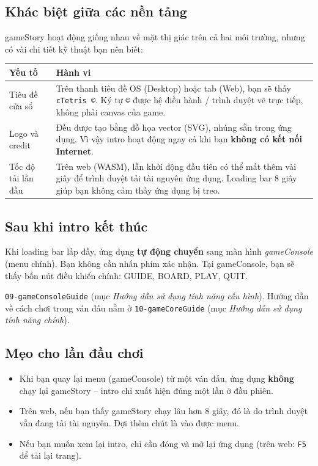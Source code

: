 \documentclass[12pt,a4paper]{article}
\begin{document}
\subsection{Khác biệt giữa các nền tảng}
gameStory hoạt động giống nhau về mặt thị giác trên cả hai môi trường, nhưng có vài chi tiết kỹ thuật bạn nên biết:

\vspace{4pt}
\begin{tabularx}{\linewidth}{|l|X|}
    \hline
    \textbf{Yếu tố} & \textbf{Hành vi} \\
    \hline
    Tiêu đề cửa sổ & Trên thanh tiêu đề OS (Desktop) hoặc tab (Web), bạn sẽ thấy \texttt{cTetris ©}. Ký tự \texttt{©} được hệ điều hành / trình duyệt vẽ trực tiếp, không phải canvas của game. \\
    \hline
    Logo và credit  & Đều được tạo bằng đồ họa vector (SVG), nhúng sẵn trong ứng dụng. Vì vậy intro hoạt động ngay cả khi bạn \textbf{không có kết nối Internet}. \\
    \hline
    Tốc độ tải lần đầu & Trên web (WASM), lần khởi động đầu tiên có thể mất thêm vài giây để trình duyệt tải tài nguyên ứng dụng. Loading bar 8 giây giúp bạn không cảm thấy ứng dụng bị treo. \\
    \hline
\end{tabularx}

\subsection{Sau khi intro kết thúc}
Khi loading bar lấp đầy, ứng dụng \textbf{tự động chuyển} sang màn hình \textit{gameConsole} (menu chính). Bạn không cần nhấn phím xác nhận. Tại gameConsole, bạn sẽ thấy bốn nút điều khiển chính: GUIDE, BOARD, PLAY, QUIT.
\begin{center}
\end{center}
\texttt{09-gameConsoleGuide} (mục \emph{Hướng dẫn sử dụng tính năng cấu hình}). Hướng dẫn về cách chơi trong ván đấu nằm ở \texttt{10-gameCoreGuide} (mục \emph{Hướng dẫn sử dụng tính năng chính}).

\subsection{Mẹo cho lần đầu chơi}
\begin{itemize}
    \item Khi bạn quay lại menu (gameConsole) từ một ván đấu, ứng dụng \textbf{không} chạy lại gameStory -- intro chỉ xuất hiện đúng một lần ở đầu phiên.
    \item Trên web, nếu bạn thấy gameStory chạy lâu hơn 8 giây, đó là do trình duyệt vẫn đang tải tài nguyên. Đợi thêm chút là vào được menu.
    \item Nếu bạn muốn xem lại intro, chỉ cần đóng và mở lại ứng dụng (trên web: \texttt{F5} để tải lại trang).
\end{itemize}
\end{document}
